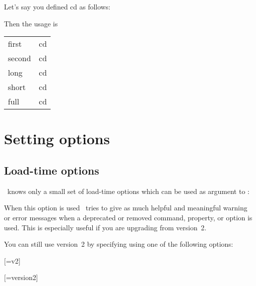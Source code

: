 \documentclass{acro-manual}
\begin{document}
Let's say you defined \acs*{cd} as follows:
\begin{sourcecode}
\end{sourcecode}
Then the usage is
\begin{example}
  \begin{tabular}{ll}
    first  & \ac{cd} \\
    second & \ac{cd} \\
    long   & \acl{cd} \\
    short  & \acs{cd} \\
    full   & \acf{cd}
  \end{tabular}
\end{example}

\section{Setting options}\label{sec:setting-options}
\subsection{Load-time options}\label{sec:load-time-options}
\acro\ knows only a small set of load-time options which can be used as
argument to :
\begin{options}
    When this option is used \acro\ tries to give as much helpful and
    meaningful warning or error messages when a deprecated or removed command,
    property, or option is used.  This is especially useful if you are
    upgrading from version~2.
\end{options}

You can still use version~2 by specifying using one of the following options:
\begin{sourcecode}
  \usepackage{acro}[=v2]
  \usepackage{acro}[=version2]
\end{sourcecode}
\end{document}
